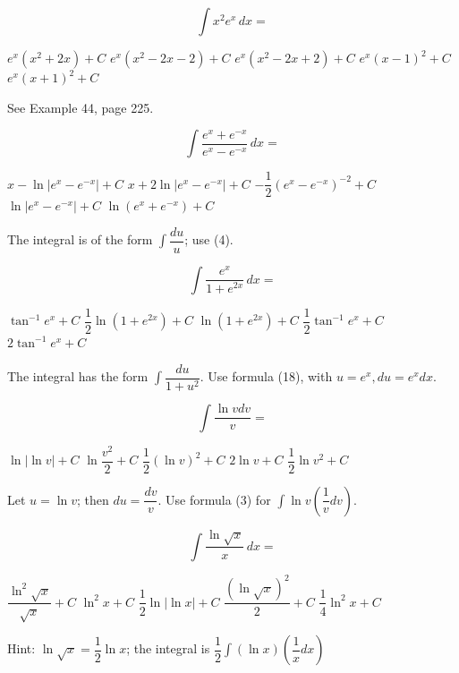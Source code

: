 \question
\[
\displaystyle\int x^{2} e^{x} \,dx=
\]
\begin{choices}
  \choice $e^{x}\left(x^{2}+2 x\right)+C$
  \choice $e^{x}\left(x^{2}-2 x-2\right)+C$
  \CorrectChoice $e^{x}\left(x^{2}-2 x+2\right)+C$
  \choice $e^{x}(x-1)^{2}+C$
  \choice $e^{x}(x+1)^{2}+C$
\end{choices}
\begin{solution}
See Example 44, page 225.
\end{solution}

\question
\[
\displaystyle\int \dfrac{e^{x}+e^{-x}}{e^{x}-e^{-x}} \,dx=
\]
\begin{choices}
  \choice $x-\ln \left|e^{x}-e^{-x}\right|+C$
  \choice $x+2 \ln \left|e^{x}-e^{-x}\right|+C$
  \choice $-\dfrac{1}{2}\left(e^{x}-e^{-x}\right)^{-2}+C$
  \CorrectChoice $\ln \left|e^{x}-e^{-x}\right|+C$
  \choice $\ln \left(e^{x}+e^{-x}\right)+C$
\end{choices}
\begin{solution}
The integral is of the form $\displaystyle\int \dfrac{d u}{u}$; use (4).
\end{solution}



\newpage


\question
\[
\displaystyle\int \dfrac{e^{x}}{1+e^{2 x}} \,dx=
\]
\begin{choices}
  \CorrectChoice $\tan ^{-1} e^{x}+C$
  \choice $\dfrac{1}{2} \ln \left(1+e^{2 x}\right)+C$
  \choice $\ln \left(1+e^{2 x}\right)+C$
  \choice $\dfrac{1}{2} \tan ^{-1} e^{x}+C$
  \choice $2 \tan ^{-1} e^{x}+C$
\end{choices}
\begin{solution}
The integral has the form $\displaystyle\int \dfrac{d u}{1+u^{2}}$. Use formula (18), with $u=e^{x}, d u= e^{x} d x$.
\end{solution}

\question
\[
\displaystyle\int \dfrac{\ln v d v}{v}=
\]
\begin{choices}
  \choice $\ln |\ln v|+C$
  \choice $\ln \dfrac{v^{2}}{2}+C$
  \CorrectChoice $\dfrac{1}{2}(\ln v)^{2}+C$
  \choice $2 \ln v+C$
  \choice $\dfrac{1}{2} \ln v^{2}+C$
\end{choices}
\begin{solution}
Let $u=\ln v$; then $d u=\dfrac{d v}{v}$. Use formula (3) for $\displaystyle\int \ln v\left(\dfrac{1}{v} d v\right)$.
\end{solution}

\question
\[
\displaystyle\int \dfrac{\ln \sqrt{x}}{x} \,dx=
\]
\begin{choices}
  \choice $\dfrac{\ln ^{2} \sqrt{x}}{\sqrt{x}}+C$
  \choice $\ln ^{2} x+C$
  \choice $\dfrac{1}{2} \ln |\ln x|+C$
  \choice $\dfrac{(\ln \sqrt{x})^{2}}{2}+C$
  \CorrectChoice $\dfrac{1}{4} \ln ^{2} x+C$
\end{choices}
\begin{solution}
Hint: $\ln \sqrt{x}=\dfrac{1}{2} \ln x$; the integral is $\dfrac{1}{2} \displaystyle\int(\ln x)\left(\dfrac{1}{x} d x\right)$
\end{solution}




